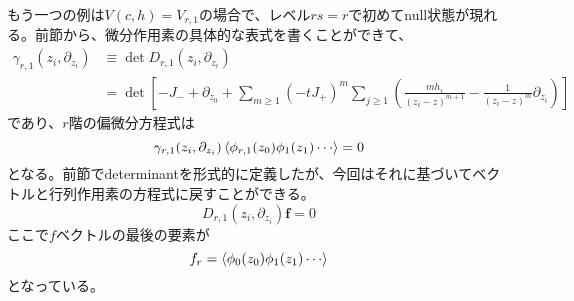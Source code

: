 \documentclass[11pt, aps, longbibliography]{article}
\numberwithin{equation}{section}
\begin{document}
        もう一つの例は$V(c,h)=V_{r,1}$の場合で、レベル$rs=r$で初めてnull状態が現れる。前節から、微分作用素の具体的な表式を書くことができて、
        \begin{align}
            \gamma_{r,1}(z_i,\partial_{z_i}) &\equiv \det D_{r,1}(z_i,\partial_{z_i}) \\
            &= \det \left[ -J_- + \partial_{z_0} + \sum_{m\geq1}(-tJ_+)^m \sum_{j\geq1}\left( \frac{mh_i}{(z_i-z)^{m+1}} - \frac{1}{(z_i-z)^m} \partial_{z_i} \right) \right]
        \end{align}
        であり、$r$階の偏微分方程式は
        \begin{equation}\label{eq:vec-eq1-12}
            \gamma_{r,1}(z_i,\partial_{z_i})\expval{\phi_{r,1}(z_0)\phi_1(z_1)\cdots} = 0
        \end{equation}
        となる。前節でdeterminantを形式的に定義したが、今回はそれに基づいてベクトルと行列作用素の方程式に戻すことができる。
        \begin{equation}\label{eq:vec-eq1-13}
            D_{r,1}(z_i,\partial_{z_i})\mathbf{f} = 0
        \end{equation}
        ここで$f$ベクトルの最後の要素が
        \begin{equation}\label{eq:vec-eq1-14}
            f_r = \expval{\phi_{0}(z_0)\phi_1(z_1)\cdots}
        \end{equation}となっている。
\end{document}
